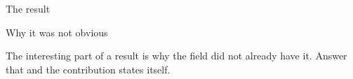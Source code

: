 
\begin{frame}{The result}
\end{frame}

\begin{frame}{Why it was not obvious}
  \begin{pullquote}
  The interesting part of a result is why the field did not already have it. Answer that and
  the contribution states itself.
  \end{pullquote}
\end{frame}
